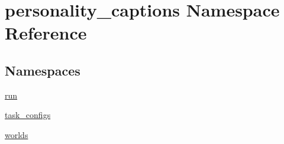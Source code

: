 \hypertarget{namespacepersonality__captions}{}\section{personality\+\_\+captions Namespace Reference}
\label{namespacepersonality__captions}
\subsection*{Namespaces}
\begin{DoxyCompactItemize}
\item 
 \hyperlink{namespacepersonality__captions_1_1run}{run}
\item 
 \hyperlink{namespacepersonality__captions_1_1task__configs}{task\+\_\+configs}
\item 
 \hyperlink{namespacepersonality__captions_1_1worlds}{worlds}
\end{DoxyCompactItemize}
